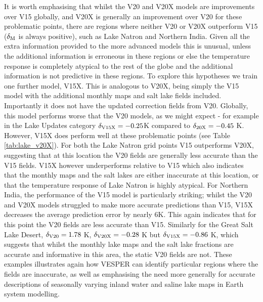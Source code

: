 \documentclass[twocolumn]{article}
\begin{document}
	\noindent It is worth emphasising that whilst the V20 and V20X models are improvements over V15 globally, and V20X is generally an improvement over V20 for these problematic points, there are regions where neither V20 or V20X outperform V15 ($\delta_{\rm M}$ is always positive), such as Lake Natron and Northern India. Given all the extra information provided to the more advanced models this is unusual, unless the additional information is erroneous in these regions or else the temperature response is completely atypical to the rest of the globe and the additional information is not predictive in these regions. To explore this hypotheses we train one further model, V15X. This is analogous to V20X, being simply the V15 model with the additional monthly maps and salt lake fields included. Importantly it does not have the updated correction fields from V20. Globally, this model performs worse that the V20 models, as we might expect - for example in the Lake Updates category $\delta_{\rm V15X} = -0.25$K compared to $\delta_{\rm 20X} = -0.45$ K. However, V15X does perform well at these problematic points (see Table \ref{tab:lake_v20X}). For both the Lake Natron grid points V15 outperforms V20X, suggesting that at this location the V20 fields are generally less accurate than the V15 fields. V15X however underperforms relative to V15 which also indicates that the monthly maps and the salt lakes are either inaccurate at this location, or that the temperature response of Lake Natron is highly atypical. For Northern India, the performance of the V15 model is particularly striking; whilst the V20 and V20X models struggled to make more accurate predictions than V15, V15X decreases the average prediction error by nearly 6K. This again indicates that for this point the V20 fields are less accurate than V15. Similarly for the Great Salt Lake Desert, $\delta_{\rm V20} = 1.78$ K, $\delta_{\rm V20X} = -0.28$ K but $\delta_{\rm V15X} = -0.86$ K, which suggests that whilst the monthly lake maps and the salt lake fractions are accurate and informative in this area, the static V20 fields are not. These examples illustrates again how VESPER can identify particular regions where the fields are inaccurate, as well as emphasising the need more generally for accurate descriptions of seasonally varying inland water and saline lake maps in Earth system modelling.  \newline 
	
	
\end{document}
